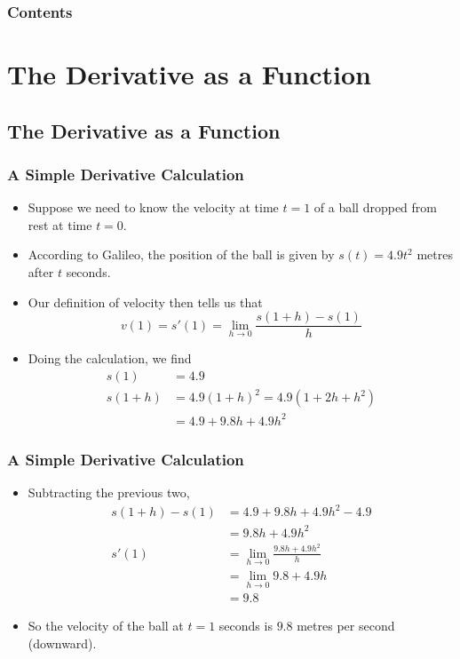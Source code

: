 \documentclass[serif,ignorenonframetext]{beamer}
\title{\commonTitleZeroTwoTwo}
\subtitle{\commonSubtitleZeroTwoTwo}
\author{\commonAuthor}
\institute{\commonInstitute}
\date{\commonDateZeroTwoTwo}
\begin{document}

\begin{frame}
  \titlepage
\end{frame}

\begin{frame}
  \frametitle{Contents}
  \tableofcontents
\end{frame}


\section{The Derivative as a Function}

\subsection{The Derivative as a Function}

\begin{frame}
  \frametitle{A Simple Derivative Calculation}
  \begin{itemize}
  \item Suppose we need to know the velocity at time $t=1$ 
    of a ball dropped from
    rest at time $t=0$.  
  \pause
  \item According to Galileo, the position of the ball
    is given by $s(t)=4.9t^2$ metres after $t$ seconds.
  \pause
  \item Our definition of velocity then tells us that
    \begin{displaymath}
      v(1) = s'(1) = \lim_{h\to 0} \frac{s(1+h)-s(1)}{h}
    \end{displaymath}
  \pause
  \item Doing the calculation, we find
    \begin{align*}
      s(1) &= 4.9 \\
      s(1+h) &= 4.9(1+h)^2 = 4.9(1+2h+h^2) \\
             &= 4.9 + 9.8h + 4.9h^2 
    \end{align*}
  \end{itemize}
\end{frame}

\begin{frame}
  \frametitle{A Simple Derivative Calculation}
  \begin{itemize}
  \item Subtracting the previous two,
    \begin{align*}
      s(1+h)-s(1) &= 4.9 + 9.8h + 4.9h^2 - 4.9  \\
                  &= 9.8 h + 4.9h^2 \\
      s'(1) &= \lim_{h\to 0} \frac{9.8h + 4.9h^2}{h} \\
            &= \lim_{h\to 0} 9.8 + 4.9 h \\
	    &= 9.8
    \end{align*}
  \pause
  \item So the velocity of the ball at $t=1$ seconds is $9.8$ metres per second
    (downward).
  \end{itemize}
\end{frame}
\end{document}
